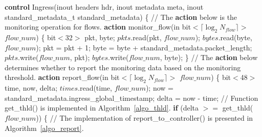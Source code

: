 \begin{algorithm}[!t]
    \caption{Data plane monitoring mechanism}
    \label{algo_ingress}
    \begin{algorithmic}[1]
        \STATE \textbf{control} Ingress(inout headers hdr,
        \STATE \hspace{1em} inout metadata meta,
        \STATE \hspace{1em} inout standard\_metadata\_t standard\_metadata) \{
        \STATE \hspace{1em} // The \textbf{action} below is the monitoring operation for flows.
        \STATE \hspace{1em} \textbf{action} monitor\_flow(in bit$<\lceil \log_2 N_{flow} \rceil>$ $flow\_num$) \{
        \STATE \hspace{2em} bit$<$32$>$ pkt, byte;
        \STATE \hspace{2em} $pkts$.read(pkt, $flow\_num$);
        \STATE \hspace{2em} $bytes$.read(byte, $flow\_num$);
        \STATE \hspace{2em} pkt = pkt + 1;
        \STATE \hspace{2em} byte = byte + standard\_metadata.packet\_length;
        \STATE \hspace{2em} $pkts$.write($flow\_num$, pkt);
        \STATE \hspace{2em} $bytes$.write($flow\_num$, byte);
        \STATE \hspace{1em} \}
        \STATE \hspace{1em} // The {\bf action} below determines whether to report the monitoring data based on the monitoring threshold.
        \STATE \hspace{1em} {\bf action} report\_flow(in bit$<\lceil \log_2 N_{flow} \rceil>$ $flow\_num$) \{
        \STATE \hspace{2em} bit$<$48$>$ time, now, delta;
        \STATE \hspace{2em} $times$.read(time, $flow\_num$);
        \STATE \hspace{2em} now = standard\_metadata.ingress\_global\_timestamp;
        \STATE \hspace{2em} delta = now - time;
        \STATE \hspace{2em} // Function get\_thld() is implemented in Algorithm~\ref{algo_thld}.
        \STATE \hspace{2em} \textbf{if} (delta $>=$ get\_thld($flow\_num$)) \{
        \STATE \hspace{3em} // The implementation of report\_to\_controller() is presented in Algorithm~\ref{algo_report}.

\end{algorithmic}
\end{algorithm}
